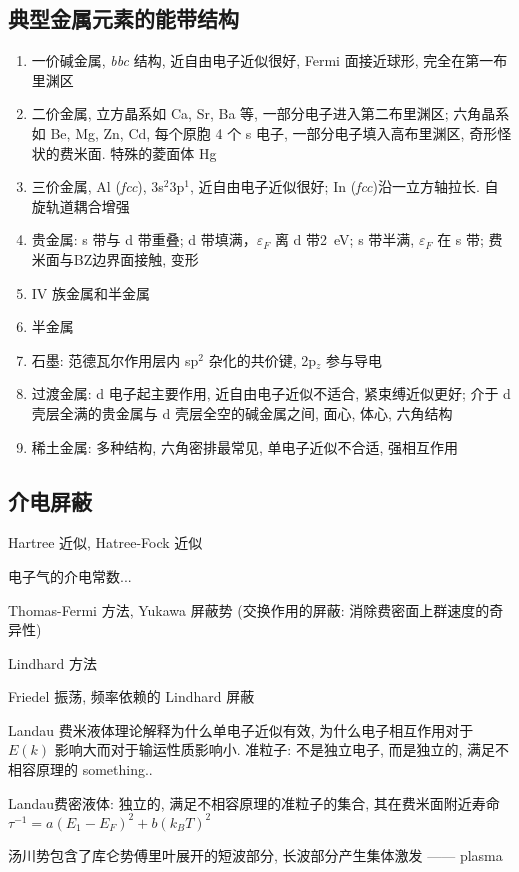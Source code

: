\documentclass[11pt,a4paper]{article}%
\numberwithin{equation}{section}%
\begin{document}
\subsection{典型金属元素的能带结构} %
\label{sub:band_for_classic_metal}
\begin{enumerate}
	\item 一价碱金属, \textit{bbc} 结构, 近自由电子近似很好, Fermi 面接近球形, 完全在第一布里渊区
	\item 二价金属, 立方晶系如 Ca, Sr, Ba 等, 一部分电子进入第二布里渊区; 六角晶系如 Be, Mg, Zn, Cd, 每个原胞 4 个 s 电子, 一部分电子填入高布里渊区, 奇形怪状的费米面. 特殊的菱面体 Hg
	\item 三价金属, Al (\textit{fcc}), 3s$^2$3p$^1$, 近自由电子近似很好; In (\textit{fcc})沿一立方轴拉长. 自旋轨道耦合增强
	\item 贵金属: s 带与 d 带重叠; d 带填满，$\varepsilon_F$ 离 d 带\SI{2}{eV}; s 带半满, $\varepsilon_F$ 在 s 带; 费米面与BZ边界面接触, 变形
	\item IV 族金属和半金属
	\item 半金属
	\item 石墨: 范德瓦尔作用层内 sp$^2$ 杂化的共价键, 2p$_z$ 参与导电
	\item 过渡金属: d 电子起主要作用, 近自由电子近似不适合, 紧束缚近似更好; 介于 d 壳层全满的贵金属与 d 壳层全空的碱金属之间, 面心, 体心, 六角结构
	\item 稀土金属: 多种结构, 六角密排最常见, 单电子近似不合适, 强相互作用
\end{enumerate}
\subsection{介电屏蔽} %
\label{sub:barrier}
Hartree 近似, Hatree-Fock 近似 %

电子气的介电常数...

Thomas-Fermi 方法, Yukawa 屏蔽势 (交换作用的屏蔽: 消除费密面上群速度的奇异性)

Lindhard 方法

Friedel 振荡, 频率依赖的 Lindhard 屏蔽

Landau 费米液体理论解释为什么单电子近似有效, 为什么电子相互作用对于 $E(k)$ 影响大而对于输运性质影响小. 准粒子: 不是独立电子, 而是独立的, 满足不相容原理的 something..

Landau费密液体: 独立的, 满足不相容原理的准粒子的集合, 其在费米面附近寿命 $\tau^{-1} = a(E_1 - E_F)^2 + b(k_B T)^2$

汤川势包含了库仑势傅里叶展开的短波部分, 长波部分产生集体激发 ------ plasma
\end{document}
